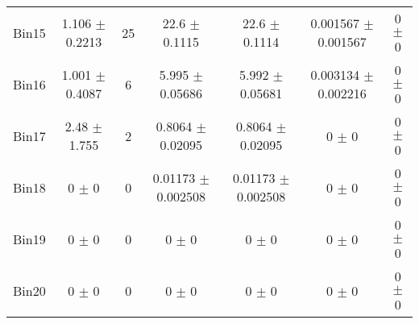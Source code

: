 \begin{tabular}{@{\extracolsep{4pt}}lcccccc@{}}
     Bin15 & 1.106 $\pm$ 0.2213 & 25 & 22.6 $\pm$ 0.1115 & 22.6 $\pm$ 0.1114 & 0.001567 $\pm$ 0.001567 & 0 $\pm$ 0 \\ 
     Bin16 & 1.001 $\pm$ 0.4087 & 6 & 5.995 $\pm$ 0.05686 & 5.992 $\pm$ 0.05681 & 0.003134 $\pm$ 0.002216 & 0 $\pm$ 0 \\ 
     Bin17 & 2.48 $\pm$ 1.755 & 2 & 0.8064 $\pm$ 0.02095 & 0.8064 $\pm$ 0.02095 & 0 $\pm$ 0 & 0 $\pm$ 0 \\ 
     Bin18 & 0 $\pm$ 0 & 0 & 0.01173 $\pm$ 0.002508 & 0.01173 $\pm$ 0.002508 & 0 $\pm$ 0 & 0 $\pm$ 0 \\ 
     Bin19 & 0 $\pm$ 0 & 0 & 0 $\pm$ 0 & 0 $\pm$ 0 & 0 $\pm$ 0 & 0 $\pm$ 0 \\ 
     Bin20 & 0 $\pm$ 0 & 0 & 0 $\pm$ 0 & 0 $\pm$ 0 & 0 $\pm$ 0 & 0 $\pm$ 0 \\ 
\hline\hline
  \end{tabular}
